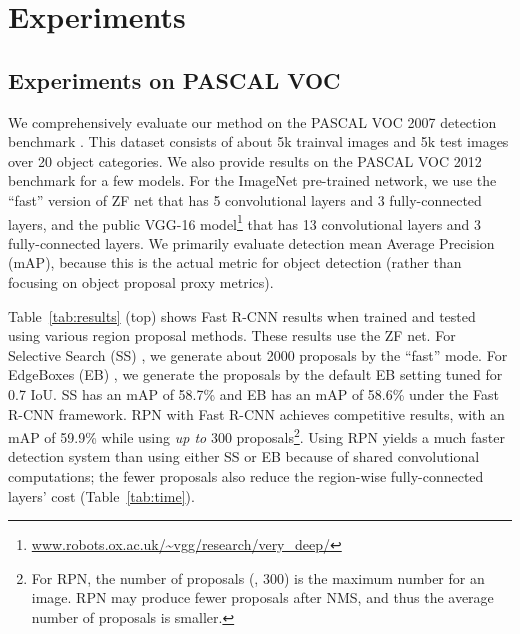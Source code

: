 \documentclass[10pt,journal,cspaper,compsoc]{IEEEtran}
\begin{document}
\section{Experiments}

\subsection{Experiments on PASCAL VOC}

We comprehensively evaluate our method on the PASCAL VOC 2007 detection benchmark \cite{Everingham2007}. This dataset consists of about 5k trainval images and 5k test images over 20 object categories.
We also provide results on the PASCAL VOC 2012 benchmark for a few models.
For the ImageNet pre-trained network, we use the ``fast'' version of ZF net \cite{Zeiler2014} that has 5 convolutional layers and 3 fully-connected layers, and the public VGG-16 model\footnote{\url{www.robots.ox.ac.uk/~vgg/research/very_deep/}} \cite{Simonyan2015} that has 13 convolutional layers and 3 fully-connected layers.
We primarily evaluate detection mean Average Precision (mAP), because this is the actual metric for object detection (rather than focusing on object proposal proxy metrics).

Table~\ref{tab:results} (top) shows Fast R-CNN results when trained and tested using various region proposal methods. These results use the ZF net.
For Selective Search (SS) \cite{Uijlings2013}, we generate about 2000 proposals by the ``fast'' mode. For EdgeBoxes (EB) \cite{Zitnick2014}, we generate the proposals by the default EB setting tuned for 0.7 IoU.
SS has an mAP of 58.7\% and EB has an mAP of 58.6\% under the Fast R-CNN framework.
RPN with Fast R-CNN achieves competitive results, with an mAP of 59.9\% while using \emph{up to} 300 proposals\footnote{For RPN, the number of proposals (\eg, 300) is the maximum number for an image. RPN may produce fewer proposals after NMS, and thus the average number of proposals is smaller.}.
Using RPN yields a much faster detection system than using either SS or EB because of shared convolutional computations; the fewer proposals also reduce the region-wise fully-connected layers' cost (Table~\ref{tab:time}).
\end{document}
